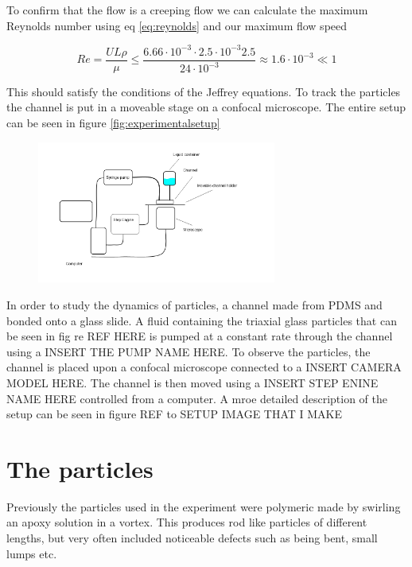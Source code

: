 To confirm that the flow is a creeping flow we can calculate the maximum Reynolds number using eq \ref{eq:reynolds} and our maximum flow speed 

\begin{equation}
Re = \frac{U L \rho}{\mu} 
\leq \frac{6.66\cdot 10^{-3} \cdot 2.5 \cdot 10^{-3} 2.5 }{24 \cdot 10^{-3}} 
\approx	 	1.6  \cdot 10^{-3} \ll 1
\end{equation}

This should satisfy the conditions of the Jeffrey equations. To track the particles the channel is put in a moveable stage on a confocal microscope. The entire setup can be seen in figure \ref{fig:experimentalsetup}

\begin{figure}
\begin{center}
\includegraphics[width=0.7\textwidth]{figures/setupsketch.png}
\end{center}
\caption{}
\label{}
\end{figure}








In order to study the dynamics of particles, a channel made from PDMS and bonded onto a glass slide. A fluid containing the triaxial glass particles that can be seen in fig re REF HERE is pumped at a constant rate through the channel using a INSERT THE PUMP NAME HERE. To observe the particles, the channel is placed upon a confocal microscope connected to a INSERT CAMERA MODEL HERE. The channel is then moved using a INSERT STEP ENINE NAME HERE controlled from a computer. A mroe detailed description of the setup can be seen in figure REF to SETUP IMAGE THAT I MAKE

\section{The particles}
	Previously the particles used in the experiment were polymeric made by swirling an apoxy solution in a vortex. This produces rod like particles of different lengths, but very often included noticeable defects such as being bent, small lumps etc. 
	
